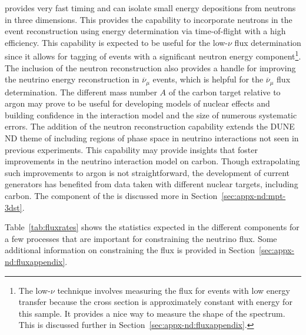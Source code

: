  provides very fast timing and can isolate small energy depositions from neutrons in three dimensions.  This provides the capability to  incorporate neutrons in the event reconstruction using energy determination via time-of-flight with a high efficiency. %
This capability is expected to be useful for the low-$\nu$ flux determination since it allows for tagging of events with a significant neutron energy component\footnote{The low-$\nu$ technique involves measuring the flux for events with low energy transfer because the cross section is approximately constant with energy for this sample.  It provides a nice way to measure the shape of the spectrum.  This is discussed further in Section~\ref{sec:appx-nd:fluxappendix}.}.   
The inclusion of the neutron reconstruction also provides a handle for improving the neutrino energy reconstruction in $\overline{\nu}_\mu$  events, which is helpful for the $\overline{\nu}_\mu$ flux determination.
The  
different mass number $A$ of the carbon target relative to argon may prove to be useful for developing models of nuclear effects and building confidence in the interaction model and the size of numerous systematic errors.  The addition of the neutron reconstruction capability extends the DUNE ND theme of including regions of phase space in neutrino interactions not seen in previous experiments.  This capability may provide insights that foster improvements in the neutrino interaction model on carbon.  Though extrapolating such improvements to argon is not straightforward, the development of current generators has benefited from data taken with different nuclear targets, including carbon. 
The  component of the  is discussed more in Section~\ref{sec:appx-nd:mpt-3dst}.

Table~\ref{tab:fluxrates} shows the statistics expected in the different  components for a few processes that are important for constraining the neutrino flux.  Some additional information on constraining the flux is provided in Section~\ref{sec:appx-nd:fluxappendix}.

